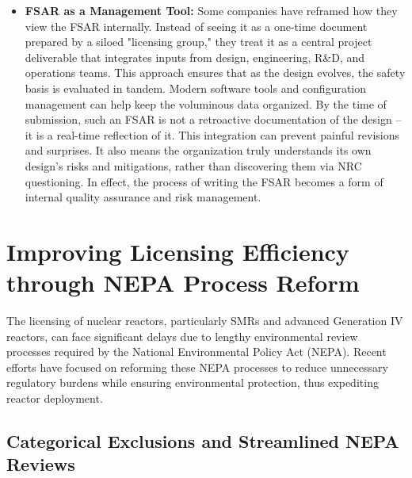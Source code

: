 \documentclass[5p,authoryear]{elsarticle}
\begin{document}
\begin{itemize}
    \item \textbf{FSAR as a Management Tool:} Some companies have reframed how they view the FSAR internally. Instead of seeing it as a one-time document prepared by a siloed "licensing group," they treat it as a central project deliverable that integrates inputs from design, engineering, R\&D, and operations teams. This approach ensures that as the design evolves, the safety basis is evaluated in tandem. Modern software tools and configuration management can help keep the voluminous data organized. By the time of submission, such an FSAR is not a retroactive documentation of the design – it is a real-time reflection of it. This integration can prevent painful revisions and surprises. It also means the organization truly understands its own design’s risks and mitigations, rather than discovering them via NRC questioning. In effect, the process of writing the FSAR becomes a form of internal quality assurance and risk management.
\end{itemize}

\section{Improving Licensing Efficiency through NEPA Process Reform}

The licensing of nuclear reactors, particularly SMRs and advanced Generation IV reactors, can face significant delays due to lengthy environmental review processes required by the National Environmental Policy Act (NEPA). Recent efforts have focused on reforming these NEPA processes to reduce unnecessary regulatory burdens while ensuring environmental protection, thus expediting reactor deployment.

\subsection{Categorical Exclusions and Streamlined NEPA Reviews}
\end{document}
